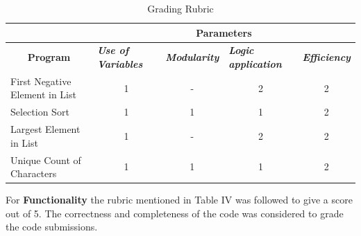\documentclass[conference]{IEEEtran}
\begin{document}
\begin{table}[!ht]
\centering
\label{tab:my-table}
\begin{tabular}{l|cccc|}
\cline{2-5}
 & \multicolumn{4}{c|}{\textbf{Parameters}} \\ \hline
\multicolumn{1}{|c|}{\textbf{Program}} & \multicolumn{1}{l|}{\textit{\textbf{Use of Variables}}} & \multicolumn{1}{l|}{\textit{\textbf{Modularity}}} & \multicolumn{1}{l|}{\textit{\textbf{Logic application}}} & \multicolumn{1}{l|}{\textit{\textbf{Efficiency}}} \\ \hline
\multicolumn{1}{|l|}{First Negative Element in List} & \multicolumn{1}{c|}{1} & \multicolumn{1}{c|}{-} & \multicolumn{1}{c|}{2} & 2 \\ \hline
\multicolumn{1}{|l|}{Selection Sort} & \multicolumn{1}{c|}{1} & \multicolumn{1}{c|}{1} & \multicolumn{1}{c|}{1} & 2 \\ \hline
\multicolumn{1}{|l|}{Largest Element in List} & \multicolumn{1}{c|}{1} & \multicolumn{1}{c|}{-} & \multicolumn{1}{c|}{2} & 2 \\ \hline
\multicolumn{1}{|l|}{Unique Count of Characters} & \multicolumn{1}{c|}{1} & \multicolumn{1}{c|}{1} & \multicolumn{1}{c|}{1} & 2 \\ \hline
\end{tabular}
\caption{Grading Rubric}
\end{table}
        
For \textbf{Functionality} the rubric mentioned in Table IV was followed to give a score out of 5. The correctness and completeness of the code was considered to grade the code submissions.
\end{document}
